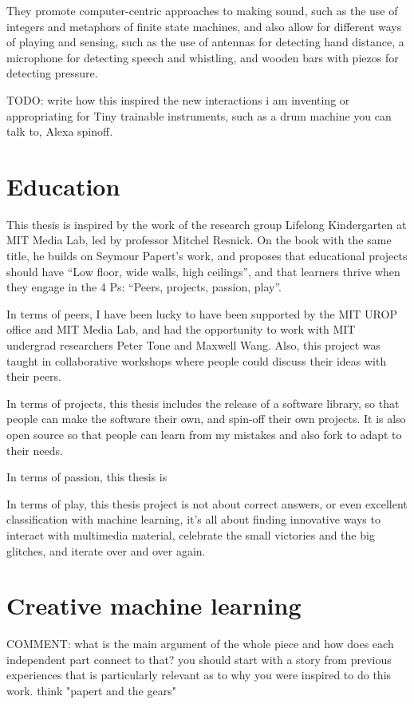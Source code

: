 They promote computer-centric approaches to making sound, such as the use of integers and metaphors of finite state machines, and also allow for different ways of playing and sensing, such as the use of antennas for detecting hand distance, a microphone for detecting speech and whistling, and wooden bars with piezos for detecting pressure.

TODO: write how this inspired the new interactions i am inventing or appropriating for Tiny trainable instruments, such as a drum machine you can talk to, Alexa spinoff.

\section{Education}

This thesis is inspired by the work of the research group Lifelong Kindergarten at MIT Media Lab, led by professor Mitchel Resnick. On the book with the same title, he builds on Seymour Papert’s work, and proposes that educational projects should have “Low floor, wide walls, high ceilings”, and that learners thrive when they engage in the 4 Ps: “Peers, projects, passion, play”.

In terms of peers, I have been lucky to have been supported by the MIT UROP office and MIT Media Lab, and had the opportunity to work with MIT undergrad researchers Peter Tone and Maxwell Wang. Also, this project was taught in collaborative workshops where people could discuss their ideas with their peers.

In terms of projects, this thesis includes the release of a software library, so that people can make the software their own, and spin-off their own projects. It is also open source so that people can learn from my mistakes and also fork to adapt to their needs.

In terms of passion, this thesis is 

In terms of play, this thesis project is not about correct answers, or even excellent classification with machine learning, it's all about finding innovative ways to interact with multimedia material, celebrate the small victories and the big glitches, and iterate over and over again.

\section{Creative machine learning}

COMMENT: what is the main argument of the whole piece and how does each independent part connect to that? you should start with a story from previous experiences that is particularly relevant as to why you were inspired to do this work. think "papert and the gears"

